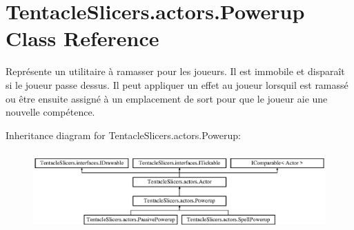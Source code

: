 \hypertarget{class_tentacle_slicers_1_1actors_1_1_powerup}{}\section{Tentacle\+Slicers.\+actors.\+Powerup Class Reference}
\label{class_tentacle_slicers_1_1actors_1_1_powerup}


Représente un utilitaire à ramasser pour les joueurs. Il est immobile et disparaît si le joueur passe dessus. Il peut appliquer un effet au joueur lorsqu\textquotesingle{}il est ramassé ou être ensuite assigné à un emplacement de sort pour que le joueur aie une nouvelle compétence.  


Inheritance diagram for Tentacle\+Slicers.\+actors.\+Powerup\+:\begin{figure}[H]
\begin{center}
\leavevmode
\includegraphics[height=3.060109cm]{class_tentacle_slicers_1_1actors_1_1_powerup}
\end{center}
\end{figure}

